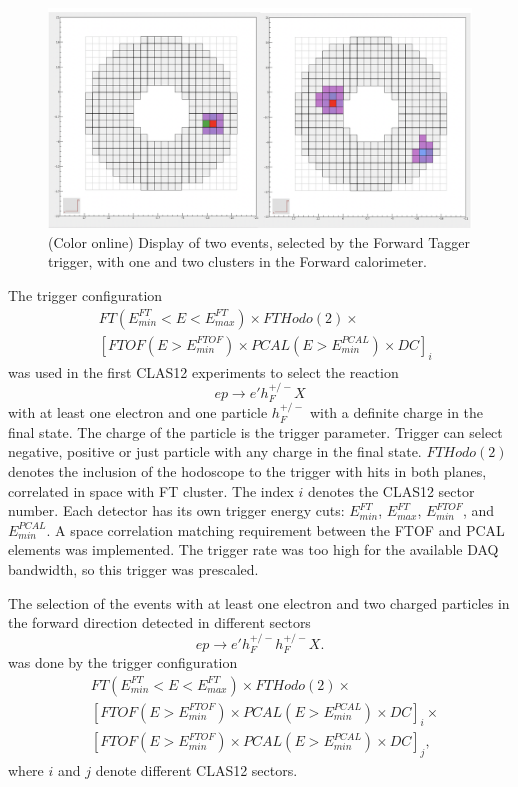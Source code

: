  \begin{figure}[!htb]
 	\centering
  	\includegraphics[width=0.95\columnwidth,keepaspectratio]{img/FT_trigger.png}
 	\caption{(Color online) Display of two events, selected by the Forward Tagger trigger, with one and two clusters in the Forward calorimeter.}
	\label{fig:FT_trigger}
\end{figure}

 The trigger configuration 
 \begin{align*} 
 &FT(E^{FT}_{min}{<}E{<}E^{FT}_{max})\times FTHodo(2)\times\\
 & [FTOF(E{>}E^{FTOF}_{min})\times PCAL(E{>}E^{PCAL}_{min})\times  DC]_i
\end{align*}
was used in the first CLAS12 experiments to select the reaction 
$$ep\to e'h^{+/-}_F X$$
 with at least one electron and one particle $h^{+/-}_F$ with a definite charge in the final state.  The charge of the particle is the trigger parameter. Trigger can select negative, positive or just   particle with any  charge in the final state.
$FTHodo(2)$ denotes the inclusion of the hodoscope to the trigger with hits in both planes, correlated  in space with FT cluster. 
The index $i$ denotes the CLAS12 sector number. Each detector has its own trigger energy cuts: $ E^{FT}_{min}$,  $E^{FT}_{max}$, $E^{FTOF}_{min}$, and $E^{PCAL}_{min}$. A space correlation matching requirement between the FTOF and PCAL elements was implemented. The trigger rate was too high for the available DAQ bandwidth, so this trigger was prescaled. 

The selection of the events with at least one electron and two charged particles in the forward direction detected in different sectors
$$
ep\to e' h^{+/-}_F h^{+/-}_F X.
$$ 
was done by the trigger configuration
 \begin{align*} 
 &FT(E^{FT}_{min}{<}E{<}E^{FT}_{max}) \times FTHodo(2)\times\\
 & [FTOF(E{>}E^{FTOF}_{min})\times  PCAL(E{>}E^{PCAL}_{min})\times   DC]_i \times \\
 & [FTOF(E{>}E^{FTOF}_{min})\times  PCAL(E{>}E^{PCAL}_{min})\times   DC]_j,
\end{align*}
where $i$ and $j$ denote different CLAS12 sectors. 
 

